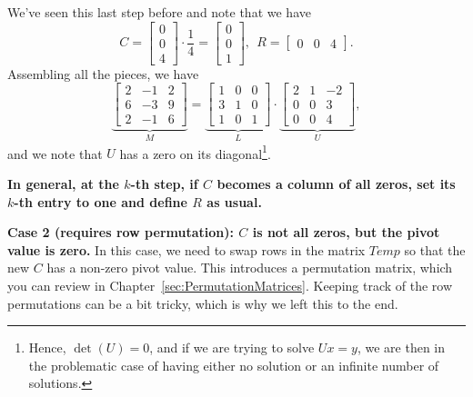 We've seen this last step before and note that we have 
$$C=  \left[\begin{array}{r} 0 \\ 0 \\ 4 \end{array} \right] \cdot \frac{1}{4} =\left[\begin{array}{r} 0 \\ 0 \\ 1 \end{array} \right] ,~~R=\left[\begin{array}{rrr} 0 & 0 & 4 \end{array} \right]. $$
Assembling all the pieces, we have 
$$\underbrace{\left[ \begin{array}{rrr} 2 & -1 & 2\\
 6 & -3& 9 \\ 2 & -1 & 6  \end{array} \right]}_{M} =  \underbrace{\left[\begin{array}{rrr} 1 & 0 & 0\\ 3 & 1 & 0\\ 1 & 0  & 1\end{array} \right]}_{L} \cdot \underbrace{\left[\begin{array}{rrr} 2 & 1 & -2 \\ 0 & 0 &  3 \\ 0 &  0 & 4\end{array} \right]}_{U}, $$
 and we note that $U$ has a zero on its diagonal\footnote{Hence, $\det(U)=0$, and if we are trying to solve $Ux = y$, we are then in the problematic case of having either no solution or an infinite number of solutions.}. \\


\begin{tcolorbox}
{\bf In general, at the $k$-th step, if $C$ becomes a column of all zeros, set its $k$-th entry to one and define $R$ as usual.}
\end{tcolorbox}
\vspace*{.7cm}


\textbf{Case 2 (requires row permutation): $C$ is not all zeros, but the pivot value is zero.} In this case, we need to swap rows in the matrix $Temp$ so that the new $C$ has a non-zero  pivot value. This introduces a permutation matrix, which you can review in Chapter~\ref{sec:PermutationMatrices}. Keeping track of the row permutations can be a bit tricky, which is why we left this to the end. \\

